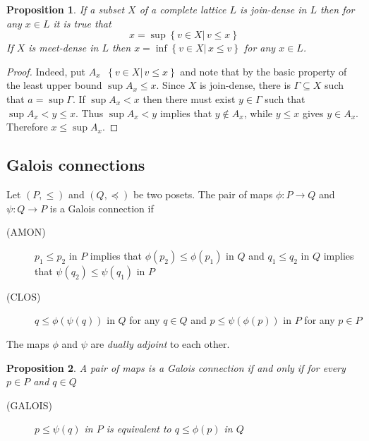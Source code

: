 \documentclass[a4paper]{article}
\newcommand{\obj}[1]{{\left\{ #1 \right \}}}
\newcommand{\brac}[1]{{\left ( #1 \right )}}
\newcommand{\induc}[1]{{\left . #1 \right \vert}}
\newtheorem{prop}{Proposition}
\newcommand{\defn}{\mathop{\overset{\Delta}{=}}\nolimits}
\begin{document}
\begin{prop} If a subset $X$ of a complete lattice $L$ is join-dense in $L$ then for any $x\in L$ it is true that \[x = \sup\obj{\induc{v\in X}\,v\leq x}\] If $X$ is meet-dense in $L$ then $x = \inf\obj{\induc{v\in X}\,x\leq v}$ for any $x\in L$.
\end{prop}

\begin{proof}
Indeed, put $A_x\defn \obj{\induc{v\in X}\,v\leq x}$ and note that by the basic property of the least upper bound $\sup A_x\leq x$. Since $X$ is join-dense, there is $\Gamma\subseteq X$ such that $a = \sup \Gamma$. If $\sup A_x < x$ then there must exist $y\in \Gamma$ such that $\sup A_x < y \leq x$. Thus $\sup A_x < y$ implies that $y\notin A_x$, while $y\leq x$ gives $y\in A_x$. Therefore $x\leq \sup A_x$.
\end{proof}


\subsection{Galois connections} %
\label{sub:galois_connections}

Let $(P,\leq)$ and $(Q,\preceq)$ be two posets. The pair of maps $\phi:P\to Q$ and $\psi:Q\to P$ is a Galois connection if \begin{description}
	\item[(AMON)] $p_1\leq p_2$ in $P$ implies that $\phi(p_2)\leq \phi(p_1)$ in $Q$ and $q_1\leq q_2$ in $Q$ implies that $\psi(q_2)\leq \psi(q_1)$ in $P$
	\item[(CLOS)] $q\leq \phi\brac{\psi(q)}$ in $Q$ for any $q\in Q$ and $p\leq \psi\brac{\phi(p)}$ in $P$ for any $p\in P$
\end{description} The maps $\phi$ and $\psi$ are \emph{dually adjoint} to each other.

\begin{prop} A pair of maps is a Galois connection if and only if for every $p\in P$ and $q\in Q$\begin{description}
	\item[(GALOIS)] $p\leq \psi(q)$ in $P$ is equivalent to $q\leq \phi(p)$ in $Q$
\end{description}
\end{prop}
\end{document}
